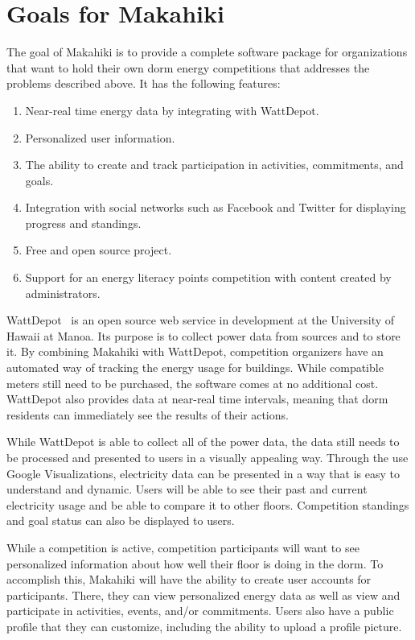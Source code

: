 \section{Goals for Makahiki}

The goal of Makahiki is to provide a complete software package for organizations that want to hold their own dorm energy competitions that addresses the problems described above.  It has the following features:

\begin{enumerate}
	\item Near-real time energy data by integrating with WattDepot.
	\item Personalized user information.
	\item The ability to create and track participation in activities, commitments, and goals.
	\item Integration with social networks such as Facebook and Twitter for displaying progress and standings.
	\item Free and open source project.
	\item Support for an energy literacy points competition with content created by administrators.
\end{enumerate}

WattDepot~\cite{wattdepot} is an open source web service in development at the University of Hawaii at Manoa.  Its purpose is to collect power data from sources and to store it. By combining Makahiki with WattDepot, competition organizers have an automated way of tracking the energy usage for buildings.  While compatible meters still need to be purchased, the software comes at no additional cost.  WattDepot also provides data at near-real time intervals, meaning that dorm residents can immediately see the results of their actions.

While WattDepot is able to collect all of the power data, the data still needs to be processed and presented to users in a visually appealing way.  Through the use Google Visualizations, electricity data can be presented in a way that is easy to understand and dynamic.  Users will be able to see their past and current electricity usage and be able to compare it to other floors.  Competition standings and goal status can also be displayed to users.

While a competition is active, competition participants will want to see personalized information about how well their floor is doing in the dorm.  To accomplish this, Makahiki will have the ability to create user accounts for participants.  There, they can view personalized energy data as well as view and participate in activities, events, and/or commitments.  Users also have a public profile that they can customize, including the ability to upload a profile picture.

